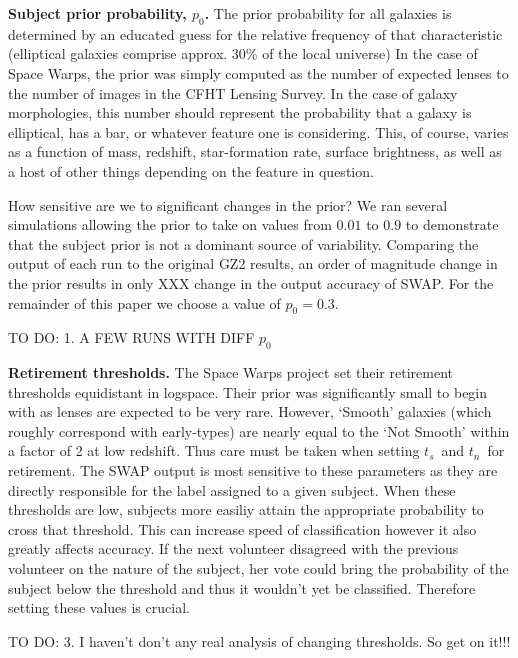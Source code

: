 \documentclass[twocolumn]{aastex6}
\newcommand{\ts}{$t_s$}
\newcommand{\tn}{$t_n$}
\begin{document}
\textbf{Subject prior probability, $p_0$.}
The prior probability for all galaxies is determined by an educated guess for the
relative frequency of that characteristic (elliptical galaxies comprise approx. 30\% of the local universe)
In the case of Space Warps, the prior was simply computed as the number of 
expected lenses to the number of images in the CFHT Lensing Survey.  
In the case of galaxy morphologies, this number should represent the probability
that a galaxy is elliptical, has a bar, or whatever feature one is considering. 
This, of course, varies as a function of mass, redshift, 
star-formation rate, surface brightness, as well as a host of other things 
depending on the feature in question. 

How sensitive are we to significant changes in the prior? We ran several simulations
allowing the prior to take on values from $0.01$ to $0.9$ to demonstrate 
that the subject prior is not a dominant source of variability. Comparing the 
output of each run to the original GZ2 results, an order of magnitude change 
in the prior results in only XXX change in the output accuracy of SWAP.  For the
remainder of this paper we choose a value of $p_0 = 0.3$. 

{\color{red} TO DO: 1. A FEW RUNS WITH DIFF $p_0$}




\textbf{Retirement thresholds.}
The Space Warps project set their retirement thresholds equidistant in logspace. 
Their prior was significantly small to begin with as lenses are expected to be very rare.
However, `Smooth' galaxies (which roughly correspond with early-types) are nearly 
equal to the `Not Smooth' within a factor of 2 at low redshift. Thus care must be taken when 
setting \ts~and \tn~for retirement. The SWAP output is most sensitive to these
parameters as they are directly responsible for the label assigned to a given subject. 
When these thresholds are low, subjects more easiliy attain the appropriate 
probability to cross that threshold. This can increase speed of classification however
it also greatly affects accuracy. If the next volunteer disagreed with the previous 
volunteer on the nature of the subject, her vote could bring the probability of
the subject below the threshold and thus it wouldn't yet be classified. 
Therefore setting these values is crucial. 

{\color{red} TO DO: 3. I haven't don't any real analysis of changing thresholds. So get on it!!!}
\end{document}
